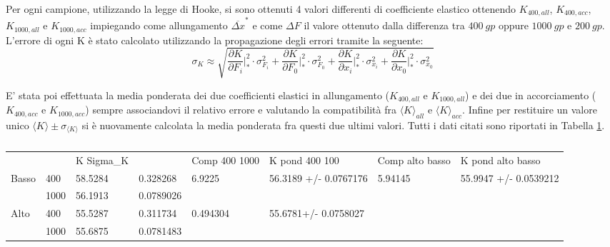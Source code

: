 \documentclass[a4paper,11pt,oneside]{article}
\begin{document}
Per ogni campione, utilizzando la legge di Hooke, si sono ottenuti 4 valori differenti di coefficiente elastico ottenendo $K_{400, all}$, $K_{400, acc}$, $K_{1000, all}$ e $K_{1000, acc}$ impiegando come  allungamento ${\overline{\Delta x}}^\ast$ e come $\Delta F$ il valore ottenuto dalla differenza tra $\SI{400}{gp}$ oppure $\SI{1000}{gp} $ e $ \SI{200}{gp}$. L'errore di ogni K è stato calcolato utilizzando la propagazione degli errori tramite la seguente:
\begin{equation*}
\sigma_K \approx \sqrt{ \frac{\partial K }{\partial F_i} \Big|_{\ast}^2 \cdot  \sigma_{ F_i}^2 +
\frac{\partial K }{\partial F_0} \Big|_{\ast}^2\cdot  \sigma_{ F_0}^2 +
 \frac{\partial K }{\partial x_i}\Big|_{\ast}^2 \cdot  \sigma_{x_i}^2 +
 \frac{\partial K }{\partial x_0}\Big|_{\ast}^2\cdot  \sigma_{x_0} ^2 }
\end{equation*}

E' stata poi effettuata la media ponderata dei due coefficienti elastici in allungamento ($K_{400, all}$ e $K_{1000, all}$) e dei due in accorciamento ($K_{400, acc}$ e $K_{1000, acc}$) sempre associandovi il relativo errore e valutando la compatibilità fra ${\langle K \rangle}_{all}$ e ${\langle K \rangle}_{acc}$. Infine per restituire un valore unico $\langle K \rangle \pm \sigma_{\langle K \rangle}$ si è nuovamente calcolata la media ponderata fra questi due ultimi valori. Tutti i dati citati sono riportati in Tabella \ref{tab:2ac_1metodo}.\\%


\begin{table}[]
\caption{}
\label{tab:2ac_1metodo}
\begin{tabular}{llllllll}
                       &      & K Sigma_K &           & Comp 400 1000             & K pond 400 100                         & Comp alto basso          & K pond alto basso                      \\
\multirow{2}{*}{Basso} & 400  & 58.5284   & 0.328268  & \multirow{2}{*}{6.9225}   & \multirow{2}{*}{56.3189 +/- 0.0767176} & \multirow{4}{*}{5.94145} & \multirow{4}{*}{55.9947 +/- 0.0539212} \\
                       & 1000 & 56.1913   & 0.0789026 &                           &                                        &                          &                                        \\
\multirow{2}{*}{Alto}  & 400  & 55.5287   & 0.311734  & \multirow{2}{*}{0.494304} & \multirow{2}{*}{55.6781+/- 0.0758027}  &                          &                                        \\
                       & 1000 & 55.6875   & 0.0781483 &                           &                                        &                          &                                       
\end{tabular}
\end{table}
\end{document}
